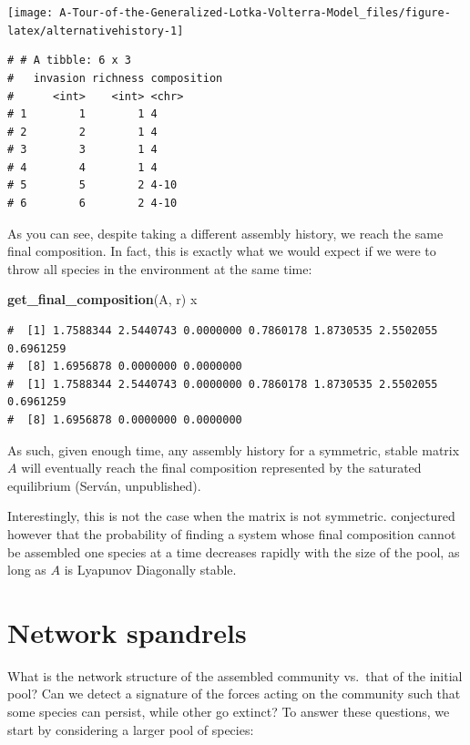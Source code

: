 \documentclass[
]{book}
\newenvironment{Shaded}{\begin{snugshade}}{\end{snugshade}}
\newcommand{\KeywordTok}[1]{\textcolor[rgb]{0.13,0.29,0.53}{\textbf{#1}}}
\newcommand{\NormalTok}[1]{#1}
\begin{document}
\begin{center}\texttt{[image: A-Tour-of-the-Generalized-Lotka-Volterra-Model\_files/figure-latex/alternativehistory-1]} \end{center}

\begin{verbatim}
# # A tibble: 6 x 3
#   invasion richness composition
#      <int>    <int> <chr>      
# 1        1        1 4          
# 2        2        1 4          
# 3        3        1 4          
# 4        4        1 4          
# 5        5        2 4-10       
# 6        6        2 4-10
\end{verbatim}

As you can see, despite taking a different assembly history, we reach the same final composition. In fact, this is exactly what we would expect if we were to throw all species in the environment at the same time:

\begin{Shaded}
\begin{Highlighting}[]
\KeywordTok{get_final_composition}\NormalTok{(A, r)}
\NormalTok{x}
\end{Highlighting}
\end{Shaded}

\begin{verbatim}
#  [1] 1.7588344 2.5440743 0.0000000 0.7860178 1.8730535 2.5502055 0.6961259
#  [8] 1.6956878 0.0000000 0.0000000
#  [1] 1.7588344 2.5440743 0.0000000 0.7860178 1.8730535 2.5502055 0.6961259
#  [8] 1.6956878 0.0000000 0.0000000
\end{verbatim}

As such, given enough time, any assembly history for a symmetric, stable matrix \(A\) will eventually reach the final composition represented by the saturated equilibrium (Serván, unpublished).

Interestingly, this is not the case when the matrix is not symmetric. \citet{servan2018coexistence} conjectured however that the probability of finding a system whose final composition cannot be assembled one species at a time decreases rapidly with the size of the pool, as long as \(A\) is Lyapunov Diagonally stable.

\hypertarget{network-spandrels}{%
\section{Network spandrels}\label{network-spandrels}}

What is the network structure of the assembled community vs.~that of the initial pool? Can we detect a signature of the forces acting on the community such that some species can persist, while other go extinct? To answer these questions, we start by considering a larger pool of species:
\end{document}
